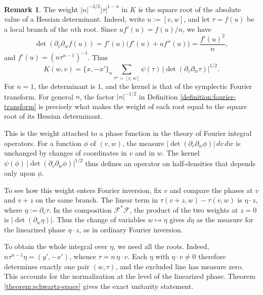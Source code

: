\documentclass[reqno]{amsart}
\theoremstyle{plain}
\theoremstyle{definition}
\newtheorem{remark}[theorem]{Remark}
\theoremstyle{itplain}
\numberwithin{equation}{section}
\numberwithin{theorem}{section}
\begin{document}
\begin{remark}\label{remark:half-density}
  The weight $\lvert n \rvert^{-3/2} \lvert \tau \rvert^{1-n}$ in $K$ is the square root of the absolute value of a Hessian determinant.  Indeed, write $u := [v, w]$, and let $\tau = f(u)$ be a local branch of the $n$th root.  Since $u f'(u) = f(u) / n$, we have
  \begin{equation*}
    \det \left( \partial_v \partial_w f(u) \right)
    = f'(u) \bigl( f'(u) + u f''(u) \bigr)
    = \frac{f'(u)^2}{n},
  \end{equation*}
  and $f'(u) = (n \tau^{n-1})^{-1}$.  Thus
  \begin{equation*}
    K(w, v) = \{x, -x'\}_n \sum_{\tau^n = [v, w]} \psi(\tau) \, \bigl\lvert \det ( \partial_v \partial_w \tau ) \bigr\rvert^{1/2}.
  \end{equation*}
  For $n = 1$, the determinant is $1$, and the kernel is that of the symplectic Fourier transform.  For general $n$, the factor $\lvert n \rvert^{-1/2}$ in Definition \ref{definition:fourier-transform} is precisely what makes the weight of each root equal to the square root of its Hessian determinant.

  This is the weight attached to a phase function in the theory of Fourier integral operators.  For a function $\phi$ of $(v, w)$, the measure $\lvert \det(\partial_v \partial_w \phi) \rvert \, d v \, d w$ is unchanged by changes of coordinates in $v$ and in $w$.  The kernel $\psi(\phi) \, \lvert \det(\partial_v \partial_w \phi) \rvert^{1/2}$ thus defines an operator on half-densities that depends only upon $\phi$.

  To see how this weight enters Fourier inversion, fix $v$ and compare the phases at $v$ and $v + z$ on the same branch.  The linear term in $\tau(v + z, w) - \tau(v, w)$ is $\eta \cdot z$, where $\eta := \partial_v \tau$.  In the composition $\mathcal{F}^* \mathcal{F}$, the product of the two weights at $z = 0$ is $\lvert \det(\partial_w \eta) \rvert$.  Thus the change of variables $w \mapsto \eta$ gives $d \eta$ as the measure for the linearized phase $\eta \cdot z$, as in ordinary Fourier inversion.

  To obtain the whole integral over $\eta$, we need all the roots.  Indeed, $n \tau^{n-1} \eta = (y', -x')$, whence $\tau = n \, \eta \cdot v$.  Each $\eta$ with $\eta \cdot v \neq 0$ therefore determines exactly one pair $(w, \tau)$, and the excluded line has measure zero.  This accounts for the normalization at the level of the linearized phase.  Theorem \ref{theorem:schwartz-space} gives the exact unitarity statement.
\end{remark}
\end{document}
